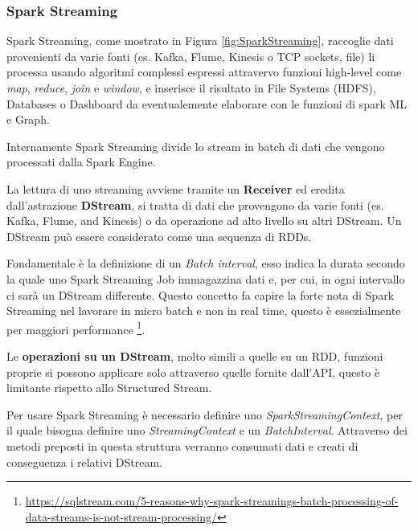 \documentclass[12pt,italian]{article}
\begin{document}
\subsubsection{Spark Streaming}
Spark Streaming, come mostrato in Figura \ref{fig:SparkStreaming}, raccoglie dati provenienti da varie fonti (es. Kafka, Flume, Kinesis o TCP sockets, file) li processa usando algoritmi complessi espressi attravervo funzioni high-level come \textit{map}, \textit{reduce}, \textit{join} e \textit{window}, e inserisce il risultato in File Systems (HDFS), Databases o Dashboard da eventualemente elaborare con le funzioni di spark ML e Graph.

Internamente Spark Streaming divide lo stream in batch di dati che vengono processati dalla Spark Engine.

La lettura di uno streaming avviene tramite un \textbf{Receiver} ed eredita dall'astrazione \textbf{DStream}, si tratta di dati che provengono da varie fonti (es. Kafka, Flume, and Kinesis) o da operazione ad alto livello su altri DStream.
Un DStream può essere considerato come una sequenza di RDDs.

Fondamentale è la definizione di un \textit{Batch interval}, esso indica la durata secondo la quale uno Spark Streaming Job immagazzina dati e, per cui, in ogni intervallo ci sarà un DStream differente.
Questo concetto fa capire la forte nota di Spark Streaming nel lavorare in micro batch e non in real time, questo è essezialmente per maggiori performance \footnote{\url{https://sqlstream.com/5-reasons-why-spark-streamings-batch-processing-of-data-streams-is-not-stream-processing/}}. %

Le \textbf{operazioni su un DStream}, molto simili a quelle su un RDD, funzioni proprie si possono applicare 
solo attraverso quelle fornite dall'API, questo è limitante rispetto allo Structured Stream.

Per usare Spark Streaming è necessario definire uno \textit{SparkStreamingContext}, per il quale bisogna definire uno \textit{StreamingContext} e un \textit{BatchInterval}.
Attraverso dei metodi preposti in questa struttura verranno consumati dati e creati di conseguenza i relativi DStream.
\end{document}
